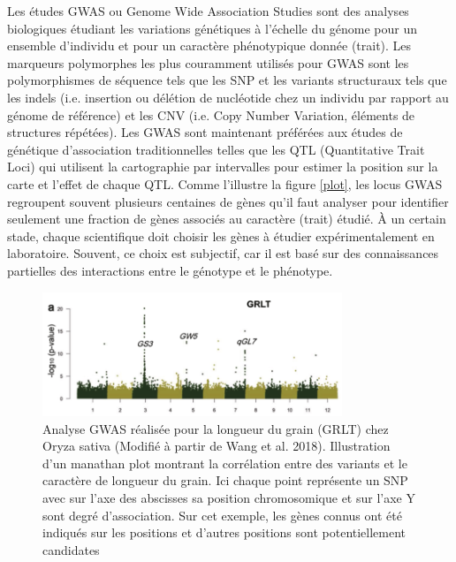 Les études GWAS ou Genome Wide Association Studies sont des analyses biologiques étudiant les variations génétiques à l'échelle du génome pour un ensemble d'individu et pour un caractère phénotypique donnée (trait). Les marqueurs polymorphes les plus couramment utilisés pour GWAS sont les polymorphismes de séquence tels que les SNP et les variants structuraux tels que les indels (i.e. insertion ou délétion de nucléotide chez un individu par rapport au génome de référence) et les CNV (i.e. Copy Number Variation, éléments de structures répétées). Les GWAS sont maintenant préférées aux études de génétique d'association traditionnelles telles que les QTL (Quantitative Trait Loci) qui utilisent la cartographie par intervalles pour estimer la position sur la carte et l'effet de chaque QTL. Comme l'illustre la figure \ref{plot}, les locus GWAS regroupent souvent plusieurs centaines de gènes qu'il faut analyser pour identifier seulement une fraction de gènes associés au caractère (trait) étudié.  À un certain stade, chaque scientifique doit choisir les gènes à étudier expérimentalement en laboratoire. Souvent, ce choix est subjectif, car il est basé sur des connaissances partielles des interactions entre le génotype et le phénotype.


\begin{figure}[!ht]
    \centering
    \includegraphics[width=0.8\textwidth]{hdr_manuscript/Figures/Manathan_Plot_rice.png}
    \caption{Analyse GWAS réalisée pour la longueur du grain (GRLT) chez Oryza sativa (Modifié à partir de Wang et al. 2018). Illustration d'un manathan plot montrant la corrélation entre des variants et le caractère de longueur du grain. Ici chaque point représente un SNP avec sur l'axe des abscisses sa position chromosomique et sur l'axe Y sont degré d'association. Sur cet exemple, les gènes connus ont été indiqués sur les positions et d'autres positions sont potentiellement candidates }
    \label{fig:plot}
\end{figure}


